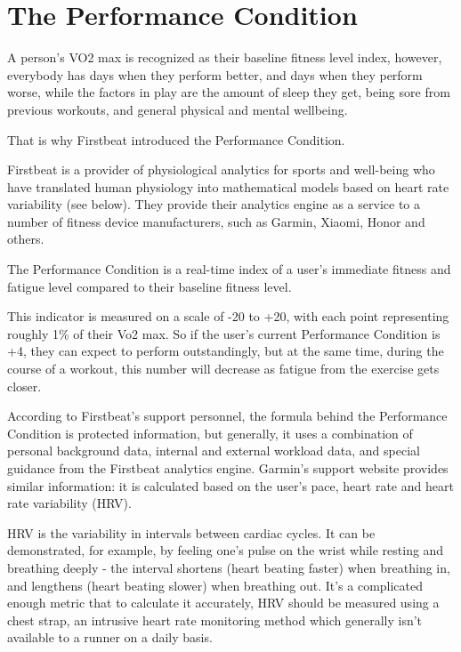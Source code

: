 \section{The Performance Condition}

A person's VO2 max is recognized as their baseline fitness level index, however, everybody has days when they perform better, and days when they perform worse, while the factors in play are the amount of sleep they get, being sore from previous workouts, and general physical and mental wellbeing.

That is why Firstbeat introduced the Performance Condition.

Firstbeat is a provider of physiological analytics for sports and well-being who have translated human physiology into mathematical models based on heart rate variability (see below).
They provide their analytics engine as a service to a number of fitness device manufacturers, such as Garmin, Xiaomi, Honor and others.

The Performance Condition is a real-time index of a user's immediate fitness and fatigue level compared to their baseline fitness level.

This indicator is measured on a scale of -20 to +20, with each point representing roughly 1\% of their Vo2 max.
So if the user's current Performance Condition is +4, they can expect to perform outstandingly,
but at the same time, during the course of a workout, this number will decrease as fatigue from the exercise gets closer.\cite{performance-condition-firstbeat}\cite{performance-condition-garmin}

According to Firstbeat's support personnel, the formula behind the Performance Condition is protected information,
but generally, it uses a combination of personal background data, internal and external workload data, and special guidance from the Firstbeat analytics engine.\cite{firstbeat-performance-condition-emails}
Garmin's support website provides similar information: it is calculated based on the user's pace, heart rate and heart rate variability (HRV).\cite{performance-condition-garmin}

HRV is the variability in intervals between cardiac cycles.
It can be demonstrated, for example, by feeling one's pulse on the wrist while resting and breathing deeply - the interval shortens (heart beating faster) when breathing in, and lengthens (heart beating slower) when breathing out.\cite{hrv}
It's a complicated enough metric that to calculate it accurately, HRV should be measured using a chest strap,
an intrusive heart rate monitoring method which generally isn't available to a runner on a daily basis.

